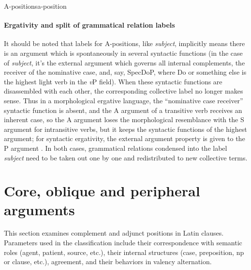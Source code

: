 \documentclass[a4paper, oneside]{report}
\newcommand*{\term}[1]{\emph{#1}}
\newcommand{\vP}{\textit{v}P}
\begin{document}
\begin{theorybox}{A-positions}{a-position}
    \paragraph*{Ergativity and split of grammatical relation labels}
    It should be noted that labels for A-positions, like \term{subject},
    implicitly means there is an argument which is spontaneously in several syntactic functions
    (in the case of \term{subject}, 
    it's the external argument which governs all internal complements, 
    the receiver of the nominative case, and, say, SpecDoP, 
    where Do or something else is the highest light verb in the \vP{} field).
    When these syntactic functions are disassembled with each other, 
    the corresponding collective label no longer makes sense.
    Thus in a morphological ergative language, 
    the ``nominative case receiver'' syntactic function is absent, 
    and the A argument of a transitive verb receives an inherent case, 
    so the A argument loses the morphological resemblance with the 
    S argument for intransitive verbs, 
    but it keeps the syntactic functions of 
    the highest argument; 
    for syntactic ergativity, 
    the external argument property is given to the P argument \citep{aldridge2008generative}.
    In both cases, grammatical relations condensed into the label \term{subject} 
    need to be taken out one by one and redistributed to new collective terms.
\end{theorybox}

\section{Core, oblique and peripheral arguments}

This section examines complement and adjunct positions in Latin clauses. 
Parameters used in the classification include 
their correspondence with semantic roles 
(agent, patient, source, etc.),
their internal structures (case, preposition, \acs{np} or clause, etc.), 
agreement, and
their behaviors in valency alternation.
\end{document}
